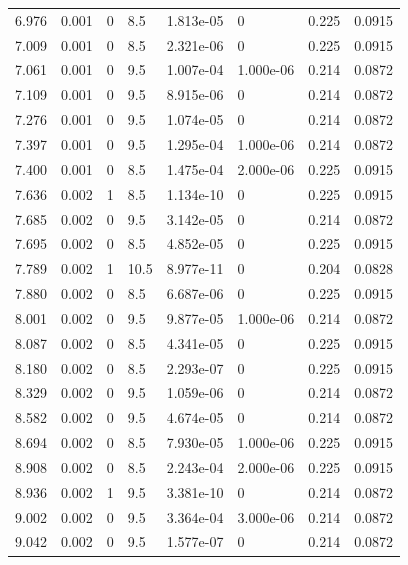 \documentclass[preview]{standalone}
\begin{document}
{{{\begin{tabular}{L{1.2cm}C{1.2cm} C{0.3cm}C{0.5cm} C{1.4cm}C{1.4cm} C{1.4cm}C{1.4cm}}
  6.976  &  0.001  & 0     & 8.5 &  1.813e-05  & 0  & 0.225 &  0.0915   \\ 
  7.009  &  0.001  & 0     & 8.5 &  2.321e-06  & 0  & 0.225 &  0.0915   \\ 
  7.061  &  0.001  & 0     & 9.5 &  1.007e-04  & 1.000e-06  & 0.214 &  0.0872   \\ 
  7.109  &  0.001  & 0     & 9.5 &  8.915e-06  & 0  & 0.214 &  0.0872   \\ 
  7.276  &  0.001  & 0     & 9.5 &  1.074e-05  & 0  & 0.214 &  0.0872   \\ 
  7.397  &  0.001  & 0     & 9.5 &  1.295e-04  & 1.000e-06  & 0.214 &  0.0872   \\ 
  7.400  &  0.001  & 0     & 8.5 &  1.475e-04  & 2.000e-06  & 0.225 &  0.0915   \\ 
  7.636  &  0.002  & 1     & 8.5 &  1.134e-10  & 0  & 0.225 &  0.0915   \\ 
  7.685  &  0.002  & 0     & 9.5 &  3.142e-05  & 0  & 0.214 &  0.0872   \\ 
  7.695  &  0.002  & 0     & 8.5 &  4.852e-05  & 0  & 0.225 &  0.0915   \\ 
  7.789  &  0.002  & 1     & 10.5 &  8.977e-11  & 0  & 0.204 &  0.0828   \\ 
  7.880  &  0.002  & 0     & 8.5 &  6.687e-06  & 0  & 0.225 &  0.0915   \\ 
  8.001  &  0.002  & 0     & 9.5 &  9.877e-05  & 1.000e-06  & 0.214 &  0.0872   \\ 
  8.087  &  0.002  & 0     & 8.5 &  4.341e-05  & 0  & 0.225 &  0.0915   \\ 
  8.180  &  0.002  & 0     & 8.5 &  2.293e-07  & 0  & 0.225 &  0.0915   \\ 
  8.329  &  0.002  & 0     & 9.5 &  1.059e-06  & 0  & 0.214 &  0.0872   \\ 
  8.582  &  0.002  & 0     & 9.5 &  4.674e-05  & 0  & 0.214 &  0.0872   \\ 
  8.694  &  0.002  & 0     & 8.5 &  7.930e-05  & 1.000e-06  & 0.225 &  0.0915   \\ 
  8.908  &  0.002  & 0     & 8.5 &  2.243e-04  & 2.000e-06  & 0.225 &  0.0915   \\ 
  8.936  &  0.002  & 1     & 9.5 &  3.381e-10  & 0  & 0.214 &  0.0872   \\ 
  9.002  &  0.002  & 0     & 9.5 &  3.364e-04  & 3.000e-06  & 0.214 &  0.0872   \\ 
  9.042  &  0.002  & 0     & 9.5 &  1.577e-07  & 0  & 0.214 &  0.0872   \\ 

\end{tabular}}}}
\end{document}
